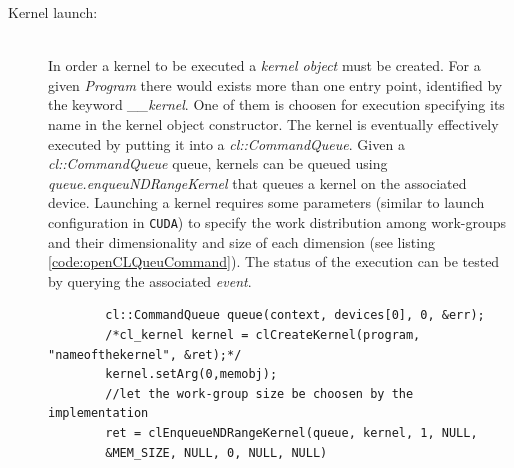 \begin{description}
\begin{description}
    	
    	\item [Kernel launch:]\hfil \\
    	In order a kernel to be executed a \emph{kernel object} must be created.
    	For a given \emph{Program} there would exists more than one entry point, identified by the keyword \emph{\_\_kernel}. One of them is choosen for execution specifying its name in the kernel object constructor.    	
    	The kernel is eventually effectively executed by putting it into a 
    	\emph{cl::CommandQueue}. Given a \textit{cl::CommandQueue} queue, kernels can be queued
    	using \textit{queue.enqueu\-NDRangeKernel} that queues a kernel on
    	the associated device.
    	Launching a kernel requires some parameters (similar to launch configuration in
    	\texttt{CUDA}) to specify the work distribution among
    	work-groups and their dimensionality and size of each dimension (see listing
    	\ref{code:openCLQueuCommand}). The status of the execution can be tested by querying the associated \emph{event}.
    	\begin{lstlisting}
    	cl::CommandQueue queue(context, devices[0], 0, &err);
	    /*cl_kernel kernel = clCreateKernel(program, "nameofthekernel", &ret);*/
	    kernel.setArg(0,memobj);
	    //let the work-group size be choosen by the implementation 
	    ret = clEnqueueNDRangeKernel(queue, kernel, 1, NULL,
	    &MEM_SIZE, NULL, 0, NULL, NULL)
    	\end{lstlisting}
    \end{description}
\end{description}
 

